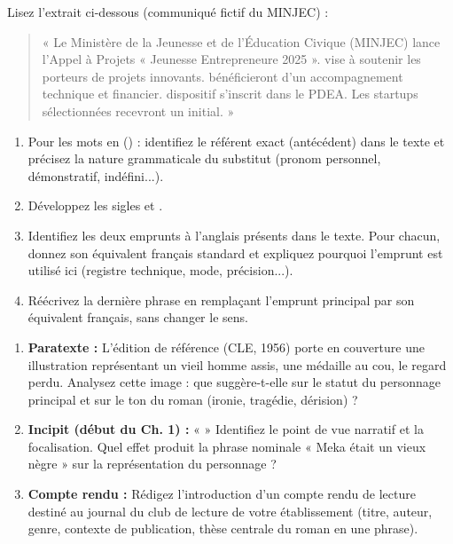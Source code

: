 \documentclass[11pt]{article}
\begin{document}
\begin{exercice}
Lisez l'extrait ci-dessous (communiqué fictif du MINJEC) :

\begin{quote}
« Le Ministère de la Jeunesse et de l'Éducation Civique (MINJEC) lance l'Appel à Projets « Jeunesse Entrepreneure 2025 ».  vise à soutenir les porteurs de projets innovants.  bénéficieront d'un accompagnement technique et financier.  dispositif s'inscrit dans le PDEA. Les startups sélectionnées recevront un  initial. »
\end{quote}

\begin{enumerate}
    \item Pour les mots en  () : identifiez le référent exact (antécédent) dans le texte et précisez la nature grammaticale du substitut (pronom personnel, démonstratif, indéfini...). 
    \item Développez les sigles  et . \pts{1 pt}
    \item Identifiez les deux emprunts à l'anglais présents dans le texte. Pour chacun, donnez son équivalent français standard et expliquez pourquoi l'emprunt est utilisé ici (registre technique, mode, précision...). 
    \item Réécrivez la dernière phrase en remplaçant l'emprunt principal par son équivalent français, sans changer le sens. \pts{1 pt}
\end{enumerate}
\end{exercice}

\begin{exercice}
\begin{enumerate}
    \item \textbf{Paratexte :} L'édition de référence (CLE, 1956) porte en couverture une illustration représentant un vieil homme assis, une médaille au cou, le regard perdu. Analysez cette image : que suggère-t-elle sur le statut du personnage principal et sur le ton du roman (ironie, tragédie, dérision) ? 
    \item \textbf{Incipit (début du Ch. 1) :} «  » Identifiez le point de vue narratif et la focalisation. Quel effet produit la phrase nominale « Meka était un vieux nègre » sur la représentation du personnage ? 
    \item \textbf{Compte rendu :} Rédigez l'introduction d'un compte rendu de lecture destiné au journal du club de lecture de votre établissement (titre, auteur, genre, contexte de publication, thèse centrale du roman en une phrase). 
\end{enumerate}
\end{exercice}
\end{document}
